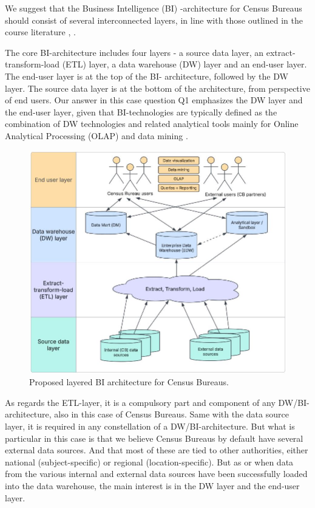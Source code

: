 We suggest that the Business Intelligence (BI) -architecture for Census Bureaus should consist of several interconnected layers, 
in line with those outlined in the course literature \cite[chapter~31.2]{CourseLitt}, \cite{l2video}. 

The core BI-architecture includes four layers - a source data layer, an extract-transform-load (ETL) layer, 
a data warehouse (DW) layer and an end-user layer. 
The end-user layer is at the top of the BI- architecture, followed by the DW layer. 
The source data layer is at the bottom of the architecture, from perspective of end users. 
Our answer in this case question Q1 emphasizes the DW layer and the end-user layer, 
given that BI-technologies are typically defined as the combination of DW technologies and 
related analytical tools mainly for Online Analytical Processing (OLAP) and data mining \cite[chapter~33.]{CourseLitt}.  

\begin{figure}[h] %
  \centering
  \includegraphics[width=1.0\textwidth]{Figures/Q1_BI_architecture.jpg}
  \caption{Proposed layered BI architecture for Census Bureaus.}
  \label{fig:BI_arch}
\end{figure}
\newpage
As regards the ETL-layer, it is a compulsory part and component of any DW/BI-architecture, 
also in this case of Census Bureaus. 
Same with the data source layer, it is required in any constellation of a DW/BI-architecture. 
But what is particular in this case is that we believe Census Bureaus by default have 
several external data sources. 
And that most of these are tied to other authorities, 
either national (subject-specific) or regional (location-specific). 
But as or when data from the various internal and external data sources have been successfully loaded into 
the data warehouse, the main interest is in the DW layer and the end-user layer.  

